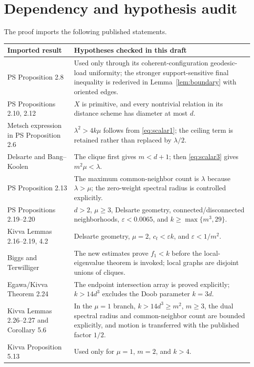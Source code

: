 \documentclass[11pt]{amsart}
\theoremstyle{definition}
\newcommand{\eps}{\varepsilon}
\begin{document}
\section{Dependency and hypothesis audit}\label{sec:audit}
The proof imports the following published statements.

\begin{center}
\small
\begin{tabular}{@{}>{\raggedright\arraybackslash}p{}p{}@{}}
\toprule
Imported result & Hypotheses checked in this draft \\
\midrule
PS Proposition 2.8 & Used only through its coherent-configuration geodesic-load uniformity; the stronger support-sensitive final inequality is rederived in Lemma~\ref{lem:boundary} with oriented edges. \\
PS Propositions 2.10, 2.12 & $X$ is primitive, and every nontrivial relation in its distance scheme has diameter at most $d$. \\
Metsch expression in PS Proposition 2.6 & $\lambda^2>4k\mu$ follows from \eqref{eq:scalar1}; the ceiling term is retained rather than replaced by $\lambda/2$. \\
Delsarte and Bang--Koolen & The clique first gives $m<d+1$; then \eqref{eq:scalar3} gives $m^2\mu<\lambda$. \\
PS Proposition 2.13 & The maximum common-neighbor count is $\lambda$ because $\lambda>\mu$; the zero-weight spectral radius is controlled explicitly. \\
PS Propositions 2.19--2.20 & $d>2$, $\mu\ge3$, Delsarte geometry, connected/disconnected neighborhoods, $\eps<0.0065$, and $k\ge\max\{m^3,29\}$. \\
Kivva Lemmas 2.16--2.19, 4.2 & Delsarte geometry, $\mu=2$, $c_t<\eps k$, and $\eps<1/m^2$. \\
Biggs and Terwilliger & The new estimates prove $f_1<k$ before the local-eigenvalue theorem is invoked; local graphs are disjoint unions of cliques. \\
Egawa/Kivva Theorem 2.24 & The endpoint intersection array is proved explicitly; $k>14d^3$ excludes the Doob parameter $k=3d$. \\
Kivva Lemmas 2.26--2.27 and Corollary 5.6 & In the $\mu=1$ branch, $k>14d^3\ge m^2$, $m\ge3$, the dual spectral radius and common-neighbor count are bounded explicitly, and motion is transferred with the published factor $1/2$. \\
Kivva Proposition 5.13 & Used only for $\mu=1$, $m=2$, and $k>4$. \\
\bottomrule
\end{tabular}
\end{center}
\end{document}
